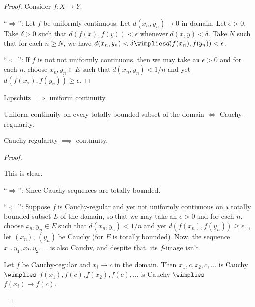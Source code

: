 	\begin{proof}
		Consider $f\colon X\to Y$.
		
		``$\Rightarrow$'': Let $f$ be uniformly continuous. Let $d(x_n, y_n)\to 0$ in domain. Let $\epsilon > 0$. Take $\delta> 0$ such that $d(f(x), f(y)) < \epsilon$ whenever $d(x, y) < \delta$. Take $N$ such that for each $n\ge N$, we have $d(x_n, y_n) < \delta\wimplies d(f(x_n), f(y_n)) < \epsilon$.
		
		``$\Leftarrow$'': If $f$ is not not uniformly continuous, then we may take an $\epsilon > 0$ and for each $n$, choose
		$x_n, y_n\in E$ such that $d(x_n, y_n) < 1/n$ and yet $d(f(x_n), f(y_n)) \ge \epsilon$.
	\end{proof}
	

	\begin{prp}
		\leavevmode
		\begin{mylist}
			\item Lipschitz $\implies$ uniform continuity.
			
			\item Uniform continuity on every totally bounded subset of the domain $\iff$ Cauchy-regularity.
			
			\item Cauchy-regularity $\implies$ continuity.
		\end{mylist}
	\end{prp}
	
	\begin{proof}
		\begin{mylist}
			\item This is clear.
			
			
			\item ``$\Rightarrow$'': Since Cauchy sequences are totally bounded.
			
			``$\Leftarrow$'': Suppose $f$ is Cauchy-regular and yet not uniformly continuous on a totally bounded subset $E$ of the domain, so that we may take an $\epsilon > 0$ and for each $n$, choose
			$x_n, y_n\in E$ such that $d(x_n, y_n) < 1/n$ and yet $d(f(x_n), f(y_n)) \ge \epsilon$. \Wlogg, let $(x_n)$, $(y_n)$ be Cauchy (for $E$ is \uline{totally bounded}). Now, the sequence $x_1, y_1, x_2, y_2, \ldots$ is also Cauchy, and despite that, its $f$-image isn't.
			
			
			\item Let $f$ be Cauchy-regular and $x_i\to c$ in the domain. Then $x_1, c, x_2, c, \ldots$ is Cauchy $\wimplies$ $f(x_1), f(c), f(x_2), f(c), \ldots$ is Cauchy $\wimplies$ $f(x_i)\to f(c)$.\qedhere
		\end{mylist}
	\end{proof}
	
